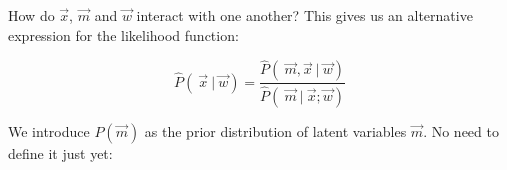 \begin{frame}{How do $\vec x$, $\vec m$ and $\vec w$ interact with one another?}
This gives us an alternative expression for the likelihood function:

\begin{equation}
\widehat{P}(~\vec x ~|~ \vec w) = \frac{\widehat{P}(~\vec m, \vec x ~|~ \vec w)}{\widehat{P}(~\vec m~|~\vec x;\vec w)}
\end{equation}

We introduce $P(\vec m)$ as the prior distribution of latent variables $\vec m$. No need to define it just yet:

\svspace{-7mm}


\end{frame}

